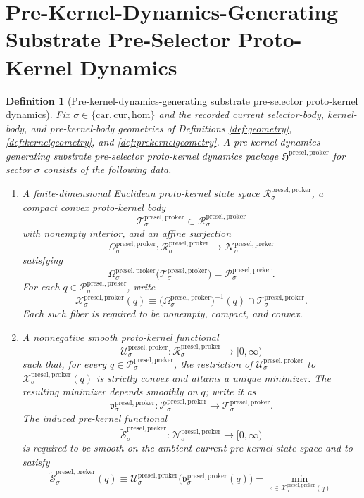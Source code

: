 \documentclass[11pt]{article}
\newcommand{\Car}{\mathrm{car}}
\newcommand{\Cur}{\mathrm{cur}}
\newcommand{\Hom}{\mathrm{hom}}
\newcommand{\PreKernelSpace}[1]{\mathcal N_{#1}^{\mathrm{presel,preker}}}
\newcommand{\PreKernelBody}[1]{\mathcal P_{#1}^{\mathrm{presel,preker}}}
\newcommand{\ProtoKernelPackage}{\mathfrak H^{\mathrm{presel,proker}}}
\newcommand{\ProtoKernelSpace}[1]{\mathcal R_{#1}^{\mathrm{presel,proker}}}
\newcommand{\ProtoKernelBody}[1]{\mathcal T_{#1}^{\mathrm{presel,proker}}}
\newcommand{\ProtoKernelProj}[1]{\Omega_{#1}^{\mathrm{presel,proker}}}
\newcommand{\ProtoKernelFiber}[2]{\mathcal X_{#1}^{\mathrm{presel,proker}}(#2)}
\newcommand{\ProtoKernelFunctional}[1]{\mathscr U_{#1}^{\mathrm{presel,proker}}}
\newcommand{\ProtoKernelMinLift}[1]{\mathfrak v_{#1}^{\mathrm{presel,proker}}}
\newcommand{\InducedPreKernelFunctional}[1]{\widetilde{\mathscr S}_{#1}^{\mathrm{presel,preker}}}
\newtheorem{definition}{Definition}
\begin{document}
\section{Pre-Kernel-Dynamics-Generating Substrate Pre-Selector Proto-Kernel Dynamics}

\begin{definition}[Pre-kernel-dynamics-generating substrate pre-selector proto-kernel dynamics]
\label{def:protokernel}
Fix \(\sigma\in\{\Car,\Cur,\Hom\}\) and the recorded current selector-body, kernel-body, and pre-kernel-body geometries of Definitions \ref{def:geometry}, \ref{def:kernelgeometry}, and \ref{def:prekernelgeometry}. A \emph{pre-kernel-dynamics-generating substrate pre-selector proto-kernel dynamics package} \(\ProtoKernelPackage\) for sector \(\sigma\) consists of the following data.
\begin{enumerate}
    \item A finite-dimensional Euclidean proto-kernel state space \(\ProtoKernelSpace{\sigma}\), a compact convex proto-kernel body
    \[
    \ProtoKernelBody{\sigma}\subset\ProtoKernelSpace{\sigma}
    \]
    with nonempty interior, and an affine surjection
    \[
    \ProtoKernelProj{\sigma}:\ProtoKernelSpace{\sigma}\to\PreKernelSpace{\sigma}
    \]
    satisfying
    \[
    \ProtoKernelProj{\sigma}\bigl(\ProtoKernelBody{\sigma}\bigr)
    =
    \PreKernelBody{\sigma}.
    \]
    For each \(q\in\PreKernelBody{\sigma}\), write
    \[
    \ProtoKernelFiber{\sigma}{q}
    \equiv
    \bigl(\ProtoKernelProj{\sigma}\bigr)^{-1}(q)\cap\ProtoKernelBody{\sigma}.
    \]
    Each such fiber is required to be nonempty, compact, and convex.
    \item A nonnegative smooth proto-kernel functional
    \[
    \ProtoKernelFunctional{\sigma}:\ProtoKernelSpace{\sigma}\to[0,\infty)
    \]
    such that, for every \(q\in\PreKernelBody{\sigma}\), the restriction of \(\ProtoKernelFunctional{\sigma}\) to \(\ProtoKernelFiber{\sigma}{q}\) is strictly convex and attains a unique minimizer. The resulting minimizer depends smoothly on \(q\); write it as
    \[
    \ProtoKernelMinLift{\sigma}:\PreKernelBody{\sigma}\to\ProtoKernelBody{\sigma}.
    \]
    The induced pre-kernel functional
    \[
    \InducedPreKernelFunctional{\sigma}:\PreKernelSpace{\sigma}\to[0,\infty)
    \]
    is required to be smooth on the ambient current pre-kernel state space and to satisfy
    \[
    \InducedPreKernelFunctional{\sigma}(q)
    \equiv
    \ProtoKernelFunctional{\sigma}\bigl(\ProtoKernelMinLift{\sigma}(q)\bigr)
    =
    \min_{z\in\ProtoKernelFiber{\sigma}{q}}
\]
\end{enumerate}
\end{definition}
\end{document}
